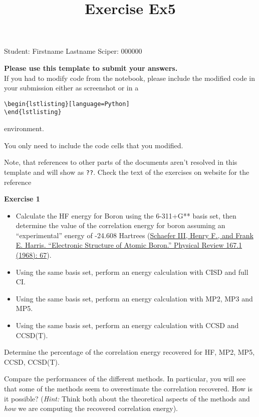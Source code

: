 \documentclass{article}
\title{Exercise Ex5}
\begin{document}
\maketitle\maketitle

Student:  Firstname Lastname    Sciper: 000000

\begin{mdframed}
\textbf{Please use this template to submit your answers.}\\
If you had to modify code from the notebook, please include the modified code in your submission either as screenshot or in a

\begin{verbatim}
\begin{lstlisting}[language=Python]
\end{lstlisting}
\end{verbatim}

environment.

You only need to include the code cells that you modified.

Note, that references to other parts of the documents aren't resolved in this template and will show as \texttt{??}. Check the text of the exercises on website for the reference
\end{mdframed}

\begin{mdframed}
\textbf{Exercise 1}\\
\begin{itemize}
\item Calculate the HF energy for Boron using the 6-311+G** basis set, then determine the value of the correlation energy for boron assuming an ``experimental'' energy of -24.608 Hartrees (\href{https://doi.org/10.1103/PhysRev.167.67}{Schaefer III, Henry F., and Frank E. Harris. ``Electronic Structure of Atomic Boron.'' Physical Review 167.1 (1968): 67}).
\item Using the same basis set, perform an energy calculation with CISD and full CI.
\item Using the same basis set, perform an energy calculation with MP2, MP3 and MP5.
\item Using the same basis set, perform an energy calculation with CCSD and CCSD(T).
\end{itemize}

Determine the percentage of the correlation energy recovered for HF, MP2, MP5, CCSD, CCSD(T).

Compare the performances of the different methods. In particular, you will see that some of the methods seem to overestimate the correlation recovered. How is it possible? (\textit{Hint:} Think both about the theoretical aspects of the methods and \textit{how} we are computing the recovered correlation energy).
\end{mdframed}
\end{document}

